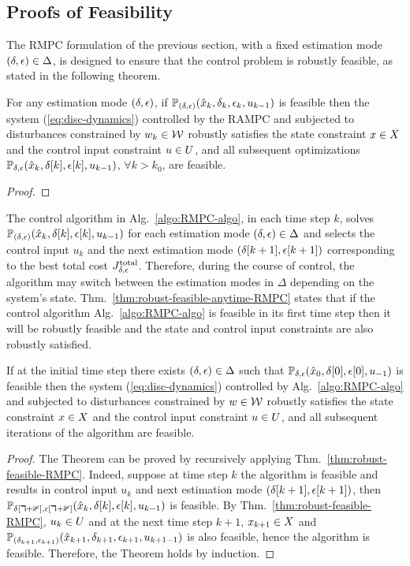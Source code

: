 \subsection{Proofs of Feasibility}
The RMPC formulation of the previous section, with a fixed estimation mode
$\left(\delta,\epsilon\right)\in\Delta$, is designed to ensure that the control problem is robustly feasible, as stated in the following theorem.
\begin{thm}
\label{thm:robust-feasible-RMPC} For
any estimation mode $\left(\delta,\epsilon\right)$, if $\mathbb{P}_{(\delta,\epsilon)}(\hat{x}_{k},\delta_{k},\epsilon_{k},u_{k -1})$
is feasible then the system (\ref{eq:disc-dynamics}) controlled by
the RAMPC and subjected to disturbances constrained by $w_k \in \mathcal{W}$
robustly satisfies the state constraint $x \in X$
and the control input constraint $u \in U$, and
all subsequent optimizations $\mathbb{P_{\delta,\epsilon}}(\hat{x}_{k},\delta[k],\epsilon[k],u_{k-1})$,
$\forall k>k_{0}$, are feasible.
\end{thm}
\begin{proof}

\end{proof}
The control algorithm in Alg.~\ref{algo:RMPC-algo}, in each time step $k$, solves $\mathbb{P_{(\delta,\epsilon)}}(\hat{x}_{k},\delta[k],\epsilon[k],u_{k-1})$ for each estimation mode $\left(\delta,\epsilon\right)\in\Delta$ and selects the control input $u_{k}$ and the next estimation mode $\left(\delta[k+1],\epsilon[k+1]\right)$
corresponding to the best total cost $J_{\delta,\epsilon}^{\mathrm{total}}$.
Therefore, during the course of control, the algorithm may switch between the estimation modes in $\Delta$ depending on the system's state. Thm.~\ref{thm:robust-feasible-anytime-RMPC} states that if the control algorithm Alg.~\ref{algo:RMPC-algo} is feasible in its first time step then it will be robustly feasible and the state and control input constraints are also robustly satisfied.
\begin{thm}%
\label{thm:robust-feasible-anytime-RMPC}
If at the initial time step there exists $\left(\delta,\epsilon\right)\in\Delta$
such that $\mathbb{P_{\delta,\epsilon}}(\hat{x}_{0},\delta[0],\epsilon[0],u_{-1})$
is feasible then the system (\ref{eq:disc-dynamics}) controlled by
Alg.~\ref{algo:RMPC-algo} and subjected to disturbances constrained
by $w \in \mathcal{W}$ robustly satisfies the state constraint
$x \in X$ and the control input constraint $u \in U$,
and all subsequent iterations of the algorithm are feasible.
\end{thm}
\begin{proof}
The Theorem can be proved by recursively applying Thm.~\ref{thm:robust-feasible-RMPC}.
Indeed, suppose at time step $k$ the algorithm
is feasible and results in control input $u_{k}$ and next estimation
mode $\left(\delta[k+1],\epsilon[k+1]\right)$, then $\mathbb{P_{\delta[k+1],\epsilon[k+1]}}(\hat{x}_{k},\delta[k],\epsilon[k],u_{k-1})$
is feasible. By Thm.~\ref{thm:robust-feasible-RMPC}, $u_{k}\in U$ and
at the next time step $k+1$, $x_{k+1}\in X$ and $\mathbb{P}_{(\delta_{k+1},\epsilon_{k+1})}(\hat{x}_{k+1},\delta_{k+1},\epsilon_{k+1},u_{k+1 -1})$
is also feasible, hence the algorithm is feasible.
Therefore, the Theorem holds by induction.
\end{proof}


